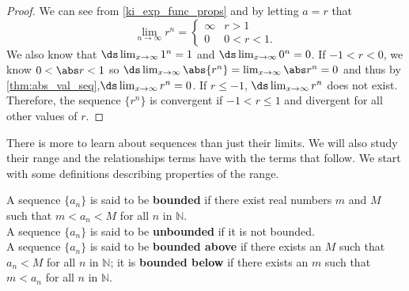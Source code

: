 


\begin{proof}
We can see from \autoref{ki_exp_func_props} and by letting $a=r$ that
\[
\lim_{n\to \infty} r^n =
\begin{cases}
\infty &  r>1\\
0 & 0<r<1.
\end{cases}
\]
We also know that $\ds  \lim_{x\to \infty} 1^n=1$ and $\ds  \lim_{x\to \infty} 0^n=0$. If $-1<r<0$, we know $0<\abs r<1$ so $\ds \lim_{x\to \infty}\abs{r^n}=\lim_{x\to \infty}\abs r^n=0$ and thus by \autoref{thm:abs_val_seq},$\ds \lim_{x\to \infty} r^n=0$. If $r\le-1$, $\ds \lim_{x\to \infty} r^n$ does not exist. Therefore, the sequence $\{ r^n\}$ is convergent if $-1<r\leq 1$ and divergent for all other values of $r$.
\end{proof}



There is more to learn about sequences than just their limits. We will also study their range and the relationships terms have with the terms that follow. We start with some definitions describing properties of the range.

{A sequence $\{a_n\}$ is said to be \textbf{bounded} if there exist real numbers $m$ and $M$ such that $m < a_n < M$ for all $n$ in $\mathbb{N}$.\\

A sequence $\{a_n\}$ is said to be \textbf{unbounded} if it is not bounded.\\

A sequence $\{a_n\}$ is said to be \textbf{bounded above} if there exists an $M$ such that $a_n < M$ for all $n$ in $\mathbb{N}$; it is \textbf{bounded below} if there exists an $m$ such that $m<a_n$ for all $n$ in $\mathbb{N}$.
}

